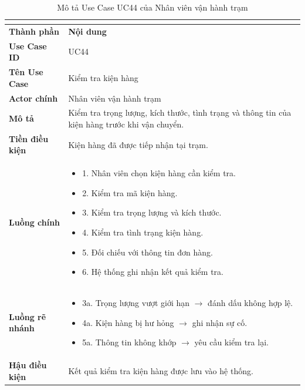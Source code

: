 \begin{longtable}{|C{3cm}|L{11cm}|}
\caption{Mô tả Use Case UC44 của Nhân viên vận hành trạm}\\
\label{tab:mo-ta-uc44-van-hanh-tram}\\
\hline
\textbf{Thành phần} & \textbf{Nội dung} \\
\hline
\textbf{Use Case ID} & UC44 \\
\hline
\textbf{Tên Use Case} & Kiểm tra kiện hàng \\
\hline
\textbf{Actor chính} & Nhân viên vận hành trạm \\
\hline
\textbf{Mô tả} &
Kiểm tra trọng lượng, kích thước, tình trạng và thông tin của kiện hàng trước khi vận chuyển.
\\
\hline
\textbf{Tiền điều kiện} &
Kiện hàng đã được tiếp nhận tại trạm.
\\
\hline
\textbf{Luồng chính} &
\begin{itemize}[leftmargin=*,topsep=2pt,itemsep=2pt]
    \item 1. Nhân viên chọn kiện hàng cần kiểm tra.
    \item 2. Kiểm tra mã kiện hàng.
    \item 3. Kiểm tra trọng lượng và kích thước.
    \item 4. Kiểm tra tình trạng kiện hàng.
    \item 5. Đối chiếu với thông tin đơn hàng.
    \item 6. Hệ thống ghi nhận kết quả kiểm tra.
\end{itemize}
\\
\hline
\textbf{Luồng rẽ nhánh} &
\begin{itemize}[leftmargin=*,topsep=2pt,itemsep=2pt]
    \item 3a. Trọng lượng vượt giới hạn $\rightarrow$ đánh dấu không hợp lệ.
    \item 4a. Kiện hàng bị hư hỏng $\rightarrow$ ghi nhận sự cố.
    \item 5a. Thông tin không khớp $\rightarrow$ yêu cầu kiểm tra lại.
\end{itemize}
\\
\hline
\textbf{Hậu điều kiện} &
Kết quả kiểm tra kiện hàng được lưu vào hệ thống.
\\
\hline
\end{longtable}


